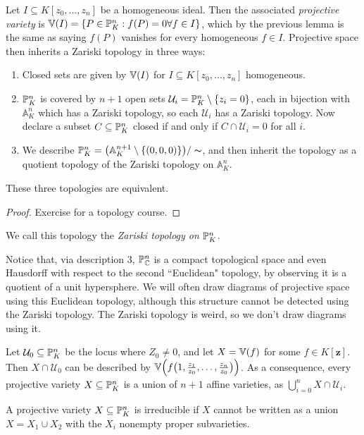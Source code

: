 \documentclass[10pt,a4paper,rgb]{article}
\begin{document}
Let $I \subseteq K[z_0, \ldots, z_n]$ be a homogeneous ideal. Then the associated \emph{projective variety} is $\V(I) = \{P \in \P^n_K : f(P) = 0 \forall f \in I\}$, which by the previous lemma is the same as saying $f(P)$ vanishes for every homogeneous $f \in I$. Projective space then inherits a Zariski topology in three ways:
\begin{enumerate}
\item Closed sets are given by $\V(I)$ for $I \subseteq K[z_0, \ldots, z_n]$ homogeneous.
\item $\P^n_K$ is covered by $n+1$ open sets $\mathcal{U}_i = \P^n_K \setminus \{z_i = 0\}$, each in bijection with $\mathbb{A}^n_K$ which has a Zariski topology, so each $\mathcal{U}_i$ has a Zariski topology. Now declare a subset $C \subseteq \P^n_K$ closed if and only if $C \cap \mathcal{U}_i = 0$ for all $i$.
\item We describe $\P^n_K = \big(\mathbb{A}^{n+1}_K \setminus \{(0,0,0)\}\big)/\thicksim$, and then inherit the topology as a quotient topology of the Zariski topology on $\mathbb{A}_K^n$.
\end{enumerate}
\begin{lemma}
These three topologies are equivalent.
\end{lemma}
\begin{proof}
Exercise for a topology course.
\end{proof}
We call this topology the \emph{Zariski topology on $\P^n_K$}.

Notice that, via description 3, $\P_\C^n$ is a compact topological space and even Hausdorff with respect to the second ``Euclidean" topology, by observing it is a quotient of a unit hypersphere. We will often draw diagrams of projective space using this Euclidean topology, although this structure cannot be detected using the Zariski topology. The Zariski topology is weird, so we don't draw diagrams using it.

Let $\mathcal{U}_0 \subseteq \P_K^n$ be the locus where $Z_0 \neq 0$, and let $X = \V(f)$ for some $f \in K[\mathbf{z}]$. Then $X \cap \mathcal{U}_0$ can be described by $\V\Big(f\big(1, \frac{z_1}{z_0}, \ldots, \frac{z_n}{z_0}\big)\Big)$. As a consequence, every projective variety $X \subseteq \P_K^n$ is a union of $n+1$ affine varieties, as $\bigcup_{i=0}^n X \cap \mathcal{U}_i$.

A projective variety $X \subseteq \P_K^n$ is irreducible if $X$ cannot be written as a union $X = X_1 \cup X_2$ with the $X_i$ nonempty proper subvarieties.
\end{document}
